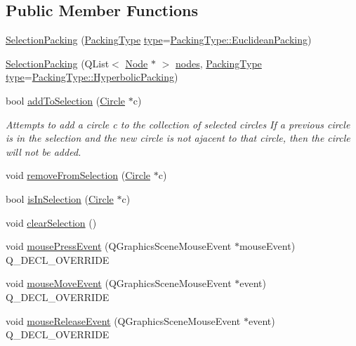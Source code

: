 \subsection*{Public Member Functions}
\begin{DoxyCompactItemize}
\item 
\hyperlink{class_selection_packing_a02c377676ebd303632c41b0e60725bf4}{Selection\+Packing} (\hyperlink{graphics_2_packing_8hpp_a331874350131c9e1039dac50b427f8b9}{Packing\+Type} \hyperlink{class_packing_a934cbe1ef81173f5e7fbabf9846d16e2}{type}=\hyperlink{graphics_2_packing_8hpp_a331874350131c9e1039dac50b427f8b9aa4066bbe6791ed6bbfe12f55a60ed152}{Packing\+Type\+::\+Euclidean\+Packing})
\item 
\hyperlink{class_selection_packing_a22e56f099a555fb00e4726e9b019be60}{Selection\+Packing} (Q\+List$<$ \hyperlink{class_node}{Node} $\ast$ $>$ \hyperlink{class_packing_afee4e76e75aea147685840e19c714d08}{nodes}, \hyperlink{graphics_2_packing_8hpp_a331874350131c9e1039dac50b427f8b9}{Packing\+Type} \hyperlink{class_packing_a934cbe1ef81173f5e7fbabf9846d16e2}{type}=\hyperlink{graphics_2_packing_8hpp_a331874350131c9e1039dac50b427f8b9af44d305ffa405b64040c7d4bc16953f9}{Packing\+Type\+::\+Hyperbolic\+Packing})
\item 
bool \hyperlink{class_selection_packing_a0a3dd7c75b32c883914c660042d3ed0b}{add\+To\+Selection} (\hyperlink{class_circle}{Circle} $\ast$c)
\begin{DoxyCompactList}\small\item\em Attempts to add a circle c to the collection of selected circles If a previous circle is in the selection and the new circle is not ajacent to that circle, then the circle will not be added. \end{DoxyCompactList}\item 
void \hyperlink{class_selection_packing_ae29608e25fcfa2bfd485c8adfc941a46}{remove\+From\+Selection} (\hyperlink{class_circle}{Circle} $\ast$c)
\item 
bool \hyperlink{class_selection_packing_a9568899d6773f596e7d679f2a50bfc8d}{is\+In\+Selection} (\hyperlink{class_circle}{Circle} $\ast$c)
\item 
void \hyperlink{class_selection_packing_a04d54c3f7efbc412756f0b775d8aef8e}{clear\+Selection} ()
\item 
void \hyperlink{class_selection_packing_a424e907d2394d6b7d5941a10f6119cbc}{mouse\+Press\+Event} (Q\+Graphics\+Scene\+Mouse\+Event $\ast$mouse\+Event) Q\+\_\+\+D\+E\+C\+L\+\_\+\+O\+V\+E\+R\+R\+I\+D\+E
\item 
void \hyperlink{class_selection_packing_a7da53f29f45ccb15816b74033e307f1e}{mouse\+Move\+Event} (Q\+Graphics\+Scene\+Mouse\+Event $\ast$event) Q\+\_\+\+D\+E\+C\+L\+\_\+\+O\+V\+E\+R\+R\+I\+D\+E
\item 
void \hyperlink{class_selection_packing_ac8acca567094473a7957e634c75293f3}{mouse\+Release\+Event} (Q\+Graphics\+Scene\+Mouse\+Event $\ast$event) Q\+\_\+\+D\+E\+C\+L\+\_\+\+O\+V\+E\+R\+R\+I\+D\+E
\end{DoxyCompactItemize}
